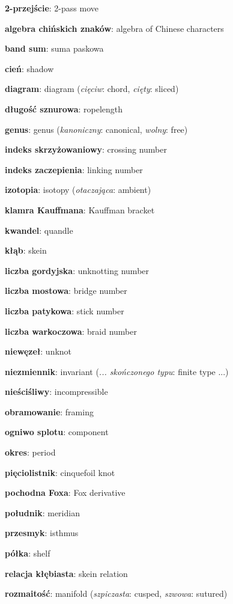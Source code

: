 \item \textbf{2-przejście}: 2-pass move
\item \textbf{algebra chińskich znaków}: algebra of Chinese characters
\item \textbf{band sum}: suma paskowa
\item \textbf{cień}: shadow
\item \textbf{diagram}: diagram
(\emph{cięciw}: chord, \emph{cięty}: sliced)
\item \textbf{długość sznurowa}: ropelength
\item \textbf{genus}: genus
(\emph{kanoniczny}: canonical, \emph{wolny}: free)
\item \textbf{indeks skrzyżowaniowy}: crossing number
\item \textbf{indeks zaczepienia}: linking number
\item \textbf{izotopia}: isotopy
(\emph{otaczająca}: ambient)
\item \textbf{klamra Kauffmana}: Kauffman bracket
\item \textbf{kwandel}: quandle
\item \textbf{kłąb}: skein
\item \textbf{liczba gordyjska}: unknotting number
\item \textbf{liczba mostowa}: bridge number
\item \textbf{liczba patykowa}: stick number
\item \textbf{liczba warkoczowa}: braid number
\item \textbf{niewęzeł}: unknot
\item \textbf{niezmiennik}: invariant
(\emph{... skończonego typu}: finite type ...)
\item \textbf{nieściśliwy}: incompressible
\item \textbf{obramowanie}: framing
\item \textbf{ogniwo splotu}: component
\item \textbf{okres}: period
\item \textbf{pięciolistnik}: cinquefoil knot
\item \textbf{pochodna Foxa}: Fox derivative
\item \textbf{południk}: meridian
\item \textbf{przesmyk}: isthmus
\item \textbf{półka}: shelf
\item \textbf{relacja kłębiasta}: skein relation
\item \textbf{rozmaitość}: manifold
(\emph{szpiczasta}: cusped, \emph{szwowa}: sutured)
